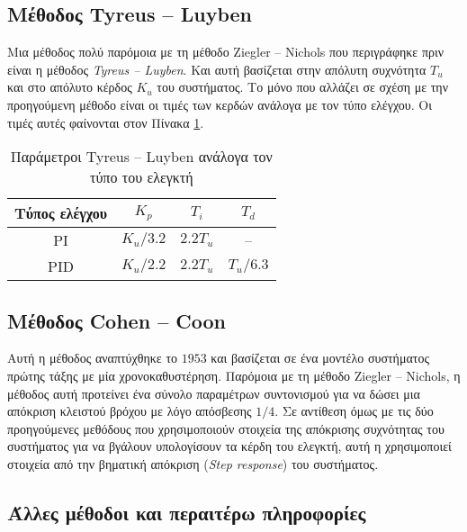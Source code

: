\subsection{Μέθοδος Tyreus -- Luyben}

Μια μέθοδος πολύ παρόμοια με τη μέθοδο Ziegler -- Nichols που περιγράφηκε πριν είναι η μέθοδος \emph{Tyreus -- Luyben}. Και αυτή βασίζεται στην απόλυτη συχνότητα $T_u$ και στο απόλυτο κέρδος $K_u$ του συστήματος. Το μόνο που αλλάζει σε σχέση με την προηγούμενη μέθοδο είναι οι τιμές των κερδών ανάλογα με τον τύπο ελέγχου. Οι τιμές αυτές φαίνονται στον Πίνακα \ref{table:tl_method}.

\begin{table}[H]
 \begin{center}
 \begin{tabular}{|c|c|c|c|}
 \hline
 Τύπος ελέγχου & $K_p$ & $T_i$ & $T_d$ \\ \hline
 PI & $K_u/3.2$ & $2.2T_u$ & -- \\ \hline
 PID & $K_u/2.2$ & $2.2T_u$ & $T_u/6.3$ \\ \hline
 \end{tabular}
 \caption{Παράμετροι Tyreus -- Luyben ανάλογα τον τύπο του ελεγκτή}
 \label{table:tl_method}
 \end{center}
\end{table}

\subsection{Μέθοδος Cohen -- Coon}

Αυτή η μέθοδος αναπτύχθηκε το $1953$ και βασίζεται σε ένα μοντέλο συστήματος πρώτης τάξης με μία χρονοκαθυστέρηση. Παρόμοια με τη μέθοδο Ziegler -- Nichols, η μέθοδος αυτή προτείνει ένα σύνολο παραμέτρων συντονισμού για να δώσει μια απόκριση κλειστού βρόχου με λόγο απόσβεσης $1/4$. Σε αντίθεση όμως με τις δύο προηγούμενες μεθόδους που χρησιμοποιούν στοιχεία της απόκρισης συχνότητας του συστήματος για να βγάλουν υπολογίσουν τα κέρδη του ελεγκτή, αυτή η χρησιμοποιεί στοιχεία από την βηματική απόκριση (\emph{Step response}) του συστήματος.

\subsection{Άλλες μέθοδοι και περαιτέρω πληροφορίες}

